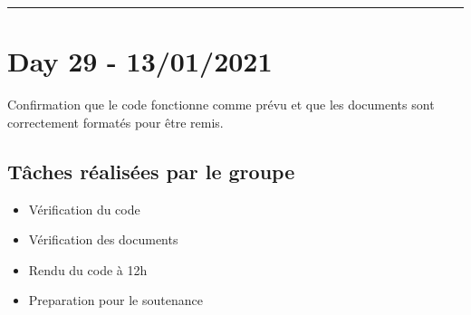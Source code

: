 \documentclass[11pt,letterpaper]{article}
\begin{document}
\noindent\rule{13cm}{0.4pt}

\section*{Day 29 - 13/01/2021}
Confirmation que le code fonctionne comme prévu et que les documents sont 
correctement formatés pour être remis.

\subsection*{Tâches réalisées par le groupe}
\begin{itemize}
    \item Vérification du code
    \item Vérification des documents
    \item Rendu du code à 12h
    \item Preparation pour le soutenance
\end{itemize}
\end{document}
